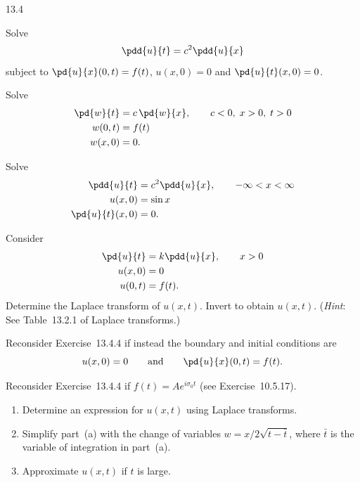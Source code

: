 \begin{exercises}{13.4}

\item Solve
\[
\pdd{u}{t} = c^2\pdd{u}{x}
\]
subject to $\pd{u}{x}(0,t) = f(t)$, $u(x,0) = 0$ and $\pd{u}{t}(x,0) = 0$.

\item Solve
\begin{align*}
\pd{w}{t} &= c\,\pd{w}{x}, \qquad c < 0,\; x > 0,\; t > 0 \\
w(0,t) &= f(t) \\
w(x,0) &= 0.
\end{align*}

\item[\starred 13.4.3.] Solve
\begin{align*}
\pdd{u}{t} &= c^2\pdd{u}{x}, \qquad -\infty < x < \infty \\
u(x,0) &= \sin x \\
\pd{u}{t}(x,0) &= 0.
\end{align*}

\item[\starred 13.4.4.] Consider
\begin{align*}
\pd{u}{t} &= k\pdd{u}{x}, \qquad x > 0 \\
u(x,0) &= 0 \\
u(0,t) &= f(t).
\end{align*}
Determine the Laplace transform of $u(x,t)$.  Invert to obtain $u(x,t)$.  (\emph{Hint}: See Table~13.2.1 of Laplace transforms.)

\item Reconsider Exercise~13.4.4 if instead the boundary and initial conditions are
\[
u(x,0) = 0 \qquad\text{and}\qquad \pd{u}{x}(0,t) = f(t).
\]

\item Reconsider Exercise~13.4.4 if $f(t) = Ae^{i\sigma_0 t}$ (see Exercise~10.5.17).
\begin{enumerate}
\item[(a)] Determine an expression for $u(x,t)$ using Laplace transforms.
\item[(b)] Simplify part~(a) with the change of variables $w = x/2\sqrt{t-\bar{t}}$, where $\bar{t}$ is the variable of integration in part~(a).
\item[(c)] Approximate $u(x,t)$ if $t$ is large.
\end{enumerate}

\end{exercises}
